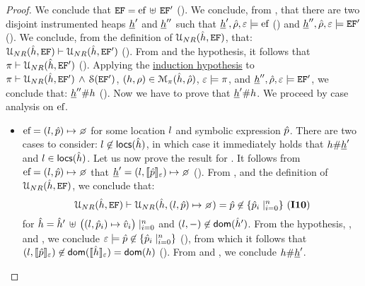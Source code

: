 \begin{proof}
\noindent{} We conclude that $\mathtt{EF} = \mathtt{\text{ef}} \, \uplus \, \mathtt{EF}'$ (). 
We conclude, from , that there are two disjoint instrumented heaps $\underline{h}'$ and $\underline{h}''$ 
such that $\underline{h}', \hat\rho, \varepsilon \models \mathtt{\text{ef}}$ () and  $\underline{h}'', \hat\rho, \varepsilon \models \mathtt{EF}'$ (). 
%
We conclude, from the definition 
of ${\mathcal U}_{NR}(\hat{h}, \mathtt{EF})$, that: ${\mathcal U}_{NR}(\hat{h}, \mathtt{EF}) \vdash {\mathcal U}_{NR}(\hat{h}, \mathtt{EF}')$ ().
From  and the hypothesis, it follows that $\pi \vdash {\mathcal U}_{NR}(\hat{h}, \mathtt{EF}')$ (). 
Applying the \underline{induction hypothesis} to $\pi \vdash {\mathcal U}_{NR}(\hat{h}, \mathtt{EF}') \, \wedge \,  {\mathcal S}(\mathtt{EF}')$, 
$(h, \rho) \in \mathcal{M}_{\pi}(\hat{h}, \hat\rho)$, $\varepsilon \models \pi$, and 
$\underline{h}'', \hat\rho, \varepsilon \models \mathtt{EF}'$, we conclude that: $\underline{h}'' \# h$ (). 
Now we have to prove that $\underline{h}' \# h$. 
We proceed by case analysis on $\mathtt{\text{ef}}$.  
\begin{itemize}
   \item $\efa = (\loc,\sexprp)\pointsto \none$ for some location $l$ and symbolic expression $\hat{p}$. 
   	    There are two cases to consider:  $l \not\in {\sf locs}(\hat{h})$, in which case 
	    it immediately holds that $h \# \underline{h}'$ and  $l \in {\sf locs}(\hat{h})$. 
	    Let us now prove the result for . 
	    It follows from $\efa = (\loc,\sexprp)\pointsto \none$ that $\iheap' = (\loc, \symbeval{\sexprp}{\senv}) \mapsto \none$ (). 
	    From , and the definition of ${\mathcal U}_{NR}(\hat{h}, \mathtt{EF})$, 
	    we conclude that: 
	    $$
	       \unificationef{\sheap}{\efs} \vdash \unificationefl{\sheap}{(\loc,\sexprp)\pointsto \none} = \sexprp \not\in \{  \sexprp_i \mid_{i = 0}^n \} \text{ (\ieq{10})} 
	    $$
	    for $\hat{h} = \hat{h}' \, \uplus \, \big((l, \hat{p}_i) \mapsto \hat{v}_i\big)\mid_{i = 0}^n$ and $(l, -) \not\in \mathsf{dom}(\hat{h}')$. 
	    From the hypothesis, , and , we conclude $\varepsilon \models   \hat{p} \not\in \{  \hat{p}_i \mid_{i = 0}^n \}$ (), 
	    from which it follows that $(l, \llbracket \hat{p} \rrbracket_{\varepsilon}) \not\in \mathsf{dom}(\llbracket \hat{h} \rrbracket_{\varepsilon}) = \mathsf{dom}(h)$ (). 
	    From  and , we conclude $h \# \underline{h}'$. 
	    \vspace{4pt}
	    

\end{itemize}
\end{proof}
